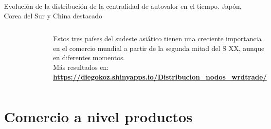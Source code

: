 \documentclass[compress]{beamer}
\begin{document}
\begin{frame}	
\small{Evolución de la distribución de la centralidad de autovalor en el tiempo. Japón, Corea del Sur y China destacado}

\begin{columns}[c] 
\begin{figure}
\includegraphics[scale=0.29]{1950_2000_impo_densidad_CHN_JPN_ROK_atvlr}
\end{figure}


\begin{flushleft}
\small
Estos tres países del sudeste asiático tienen una creciente importancia en el comercio mundial a partir de la segunda mitad del S XX, aunque en diferentes momentos. 
\\
\tiny{Más resultados en: \textbf{\url{https://diegokoz.shinyapps.io/Distribucion_nodos_wrdtrade/}}}

\end{flushleft}

\end{columns}
\end{frame}

\section{Comercio a nivel productos}
\end{document}
